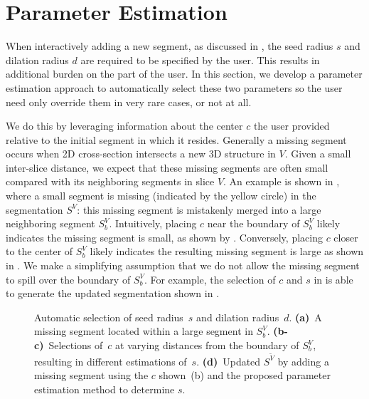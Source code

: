 \documentclass[]{spie}  %
\begin{document}
\section{Parameter Estimation}
\label{sec:param}

When interactively adding a new segment, as discussed in
, the seed radius $s$ and dilation radius $d$ are
required to be specified by the user.  This results in additional
burden on the part of the user.  In this section, we develop a
parameter estimation approach to automatically select these two
parameters so the user need only override them in very rare cases, or
not at all.

We do this by leveraging information about the center $c$ the user
provided relative to the initial segment in which it resides.
Generally a missing segment occurs when 2D cross-section intersects a
new 3D structure in $V$.  Given a small inter-slice distance, we
expect that these missing segments are often small compared with its
neighboring segments in slice $V$.  An example is shown in
, where a small segment is missing (indicated by the
yellow circle) in the segmentation $S^V$: this missing segment is
mistakenly merged into a large neighboring segment $S^V_b$.
Intuitively, placing $c$ near the boundary of $S^V_b$ likely indicates
the missing segment is small, as shown by .
Conversely, placing $c$ closer to the center of $S^V_b$ likely
indicates the resulting missing segment is large as shown in
.  We make a simplifying assumption that we do not
allow the missing segment to spill over the boundary of $S^V_b$.  For
example, the selection of $c$ and $s$ in  is able to
generate the updated segmentation shown in .
\begin{figure}[htbp]
\centering
{}
\hspace{0.1em}

\hspace{0.1em}
\caption{Automatic selection of seed radius~$s$ and dilation
  radius~$d$.  \textbf{(a)}~A missing segment located within a large
  segment in $S^V_b$.  \textbf{(b-c)}~Selections of~$c$ at varying
  distances from the boundary of $S^V_b$, resulting in different
  estimations of~$s$.  \textbf{(d)}~Updated $S^{\tilde{V}}$ by adding
  a missing segment using the $c$ shown~(b) and the proposed parameter
  estimation method to determine $s$.} \label{fig:param}
\end{figure}
\end{document}
